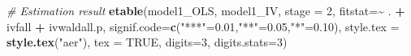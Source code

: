 \documentclass[
]{article}
\newenvironment{Shaded}{\begin{snugshade}}{\end{snugshade}}
\newcommand{\AttributeTok}[1]{\textcolor[rgb]{0.13,0.29,0.53}{#1}}
\newcommand{\CommentTok}[1]{\textcolor[rgb]{0.56,0.35,0.01}{\textit{#1}}}
\newcommand{\ConstantTok}[1]{\textcolor[rgb]{0.56,0.35,0.01}{#1}}
\newcommand{\DecValTok}[1]{\textcolor[rgb]{0.00,0.00,0.81}{#1}}
\newcommand{\FloatTok}[1]{\textcolor[rgb]{0.00,0.00,0.81}{#1}}
\newcommand{\FunctionTok}[1]{\textcolor[rgb]{0.13,0.29,0.53}{\textbf{#1}}}
\newcommand{\NormalTok}[1]{#1}
\newcommand{\OtherTok}[1]{\textcolor[rgb]{0.56,0.35,0.01}{#1}}
\newcommand{\SpecialCharTok}[1]{\textcolor[rgb]{0.81,0.36,0.00}{\textbf{#1}}}
\newcommand{\StringTok}[1]{\textcolor[rgb]{0.31,0.60,0.02}{#1}}
\begin{document}
\begin{Shaded}
\begin{Highlighting}[]
\CommentTok{\# Estimation result}
\FunctionTok{etable}\NormalTok{(model1\_OLS, model1\_IV, }\AttributeTok{stage =} \DecValTok{2}\NormalTok{, }\AttributeTok{fitstat=}\SpecialCharTok{\textasciitilde{}}\NormalTok{ . }\SpecialCharTok{+}\NormalTok{ ivfall }\SpecialCharTok{+}\NormalTok{ ivwaldall.p,}
       \AttributeTok{signif.code=}\FunctionTok{c}\NormalTok{(}\StringTok{"***"}\OtherTok{=}\FloatTok{0.01}\NormalTok{,}\StringTok{"**"}\OtherTok{=}\FloatTok{0.05}\NormalTok{,}\StringTok{"*"}\OtherTok{=}\FloatTok{0.10}\NormalTok{), }
       \AttributeTok{style.tex =} \FunctionTok{style.tex}\NormalTok{(}\StringTok{"aer"}\NormalTok{),  }\AttributeTok{tex =} \ConstantTok{TRUE}\NormalTok{,}
       \AttributeTok{digits=}\DecValTok{3}\NormalTok{, }\AttributeTok{digits.stats=}\DecValTok{3}\NormalTok{)}
\end{Highlighting}
\end{Shaded}
\end{document}
